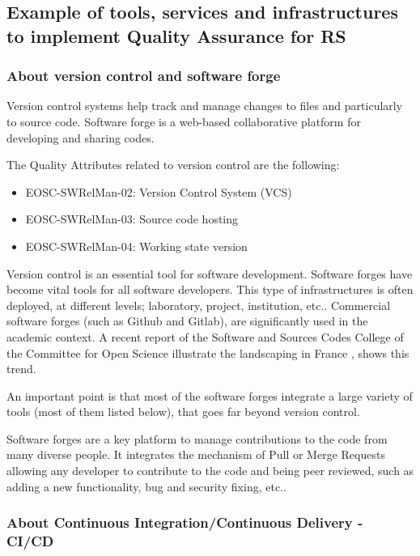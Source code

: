 \subsection{Example of tools, services and infrastructures to implement Quality Assurance for RS}

\subsubsection{About version control and software forge}

Version control systems help track and manage changes to files and particularly to source code. Software forge is a web-based collaborative platform for developing and sharing codes.

The Quality Attributes related to version control are the following:

\begin{itemize}
  \item EOSC-SWRelMan-02: Version Control System (VCS)
  \item EOSC-SWRelMan-03: Source code hosting
  \item EOSC-SWRelMan-04: Working state version
\end{itemize}

Version control is an essential tool for software development. Software forges have become vital tools for all software developers. This type of infrastructures is often deployed, at different levels; laboratory, project, institution, etc.. Commercial software forges (such as Github and Gitlab), are significantly used in the academic context. A recent report of the Software and Sources Codes College of the Committee for Open Science illustrate the landscaping in France \cite{leberre:hal-04208924}, shows this trend.

An important point is that most of the software forges integrate a large variety of tools (most of them listed below), that goes far beyond version control.

Software forges are a key platform to manage contributions to the code from many diverse people. It integrates the mechanism of Pull or Merge Requests allowing any developer to contribute to the code and being peer reviewed, such as adding a new functionality, bug and security fixing, etc..

\subsubsection{About Continuous Integration/Continuous Delivery - CI/CD}
\label{sec_cicd}

